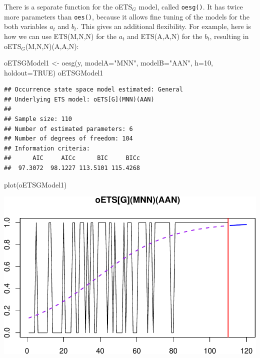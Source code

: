 \documentclass[
]{book}
\newenvironment{Shaded}{\begin{snugshade}}{\end{snugshade}}
\newcommand{\AttributeTok}[1]{\textcolor[rgb]{0.77,0.63,0.00}{#1}}
\newcommand{\ConstantTok}[1]{\textcolor[rgb]{0.00,0.00,0.00}{#1}}
\newcommand{\DecValTok}[1]{\textcolor[rgb]{0.00,0.00,0.81}{#1}}
\newcommand{\FunctionTok}[1]{\textcolor[rgb]{0.00,0.00,0.00}{#1}}
\newcommand{\NormalTok}[1]{#1}
\newcommand{\OtherTok}[1]{\textcolor[rgb]{0.56,0.35,0.01}{#1}}
\newcommand{\StringTok}[1]{\textcolor[rgb]{0.31,0.60,0.02}{#1}}
\theoremstyle{definition}
\theoremstyle{definition}
\theoremstyle{definition}
\theoremstyle{definition}
\theoremstyle{remark}
\begin{document}
There is a separate function for the oETS\(_G\) model, called \texttt{oesg()}. It has twice more parameters than \texttt{oes()}, because it allows fine tuning of the models for the both variables \(a_t\) and \(b_t\). This gives an additional flexibility. For example, here is how we can use ETS(M,N,N) for the \(a_t\) and ETS(A,A,N) for the \(b_t\), resulting in oETS\(_G\)(M,N,N)(A,A,N):

\begin{Shaded}
\begin{Highlighting}[]
\NormalTok{oETSGModel1 }\OtherTok{\textless{}{-}} \FunctionTok{oesg}\NormalTok{(y, }\AttributeTok{modelA=}\StringTok{"MNN"}\NormalTok{, }\AttributeTok{modelB=}\StringTok{"AAN"}\NormalTok{,}
                    \AttributeTok{h=}\DecValTok{10}\NormalTok{, }\AttributeTok{holdout=}\ConstantTok{TRUE}\NormalTok{)}
\NormalTok{oETSGModel1}
\end{Highlighting}
\end{Shaded}

\begin{verbatim}
## Occurrence state space model estimated: General
## Underlying ETS model: oETS[G](MNN)(AAN)
## 
## Sample size: 110
## Number of estimated parameters: 6
## Number of degrees of freedom: 104
## Information criteria: 
##      AIC     AICc      BIC     BICc 
##  97.3072  98.1227 113.5101 115.4268
\end{verbatim}

\begin{Shaded}
\begin{Highlighting}[]
\FunctionTok{plot}\NormalTok{(oETSGModel1)}
\end{Highlighting}
\end{Shaded}

\includegraphics{adam_files/figure-latex/oETSGExample1-1.pdf}
\end{document}

